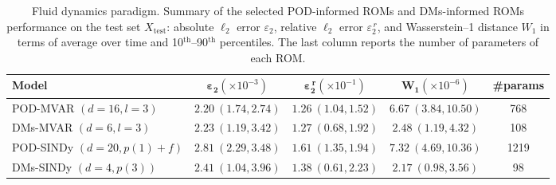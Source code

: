 \documentclass{article}
\begin{document}
\begin{table}[ht]
\centering
\setlength{\tabcolsep}{3pt}
{
\small
\begin{tabularx}{\textwidth}{lCCCC}  %
\toprule
\textbf{Model} & $\boldsymbol{\varepsilon_2} (\times 10^{-3})$ & $\boldsymbol{\varepsilon_2^{\,r}} (\times 10^{-1})$ & $\boldsymbol{W_1} (\times 10^{-6})$ & \#\textbf{params} \\
\midrule
{}
POD-MVAR \tiny{$(d=16,l=3)$} & $2.20~(1.74,2.74)$ & $1.26~(1.04,1.52)$ & $6.67~(3.84,10.50)$ & 768\\


 DMs-MVAR \tiny{$(d=6, l=3)$} & $2.23~(1.19,3.42)$ & $1.27~(0.68,1.92)$ & $2.48~(1.19,4.32)$ & 108\\

POD-SINDy \tiny{$(d=20,p(1)+f)$} & $2.81~(2.29,3.48)$ & $1.61~(1.35,1.94)$ & $7.32~(4.69,10.36)$ & 1219\\

DMs-SINDy \tiny{$(d=4, p(3))$} & $2.41~(1.04,3.96)$ & $1.38~(0.61,2.23)$ & $2.17~(0.98,3.56)$
& 98\\


\bottomrule
\end{tabularx}
}
\caption{Fluid dynamics paradigm. Summary of the selected POD-informed ROMs and DMs-informed ROMs performance on the test set \(X_{\text{test}}\): absolute $\ell_2$ error $\varepsilon_2$, relative $\ell_2$ error $\varepsilon_2^{\,r}$, and Wasserstein–1 distance $W_1$ in terms of average over time and 10$^{\text{th}}$–90$^{\text{th}}$ percentiles. The last column reports the number of parameters of each ROM.}
\label{tab:rom_metrics_test_new}
\end{table}
\end{document}
